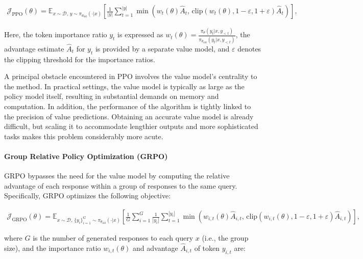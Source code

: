 \begin{align}
\mathcal{J}_\text{PPO}(\theta) = \mathbb{E}_{ x \sim \mathcal{D},\, y \sim \pi_{\theta_\text{old}}( \cdot | x) }
\left[ \frac{1}{|y|} \sum_{t=1}^{|y|} 
\min \left( w_{t}(\theta) \widehat{A}_{t},  \, \mathrm{clip} \left( w_{t}(\theta), 1 - {\varepsilon}, 1 + {\varepsilon}\right) \widehat{A}_{t} \right)
\right],
\end{align}

Here, the token importance ratio $y_t$ is expressed as $
w_{t}(\theta) = \frac{ \pi_{\theta} (y_{t} | x, y_{<t}) }{ \pi_{\theta_\text{old}} (y_{t} | x,y_{<t})} $, the advantage estimate $\widehat{A}_{t}$ for $y_t$ is provided by a separate value model, and $\varepsilon$ denotes the clipping threshold for the importance ratios.

A principal obstacle encountered in PPO involves the value model's centrality to the method. In practical settings, the value model is typically as large as the policy model itself, resulting in substantial demands on memory and computation. In addition, the performance of the algorithm is tightly linked to the precision of value predictions. Obtaining an accurate value model is already difficult, but scaling it to accommodate lengthier outputs and more sophisticated tasks makes this problem considerably more acute.

\paragraph{Group Relative Policy Optimization (GRPO)} GRPO \citep{grpo} bypasses the need for the value model by computing the relative advantage of each response within a group of responses to the same query. Specifically, GRPO optimizes the following objective:

\begin{align}
\label{equ:grpo}
\mathcal{J}_\text{GRPO}(\theta) = \mathbb{E}_{ x \sim \mathcal{D},\, \{y_i\}_{i=1}^G \sim \pi_{\theta_\text{old}}( \cdot | x) }
\left[ \frac{1}{G} \sum_{i=1}^{G} \frac{1}{|y_i|} \sum_{t=1}^{|y_i|} 
\min \left( w_{i,t}(\theta) \widehat{A}_{i,t},  \, \mathrm{clip} \left( w_{i,t}(\theta), 1 - {\varepsilon}, 1 + {\varepsilon}\right) \widehat{A}_{i,t} \right)
\right],
\end{align}

where $G$ is the number of generated responses to each query $x$ (i.e., the group size), and the importance ratio $w_{i,t}(\theta)$ and advantage $\widehat{A}_{i,t}$ of token $y_{i,t}$ are:

